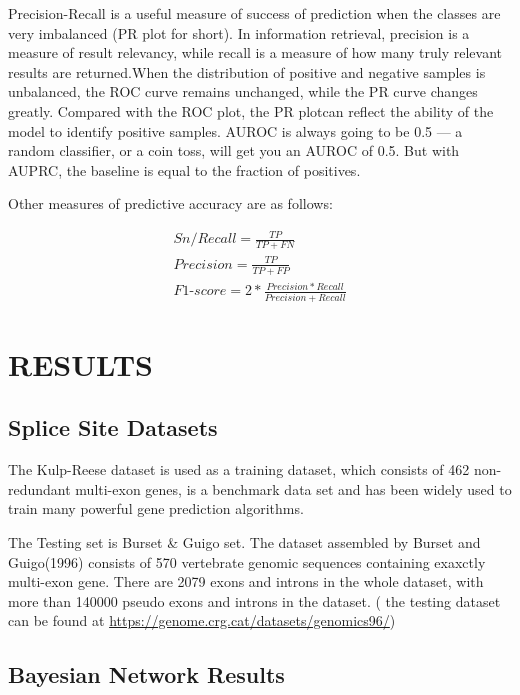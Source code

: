 \documentclass{gapd}
\begin{document}
Precision-Recall is a useful measure of success of prediction when the
classes are very imbalanced (PR plot for short). In information
retrieval, precision is a measure of result relevancy, while recall is a
measure of how many truly relevant results are returned.When the
distribution of positive and negative samples is unbalanced, the ROC
curve remains unchanged, while the PR curve changes greatly. Compared
with the ROC plot, the PR plotcan reflect the ability of the model to
identify positive samples. AUROC is always going to be 0.5 --- a random
classifier, or a coin toss, will get you an AUROC of 0.5. But with
AUPRC, the baseline is equal to the fraction of positives.

Other measures of predictive accuracy are as follows:

\begin{gather*}%
  Sn/Recall = \frac{TP}{TP+FN} \\
  Precision = \frac{TP}{TP+FP} \\
  F1\text{-}score =2* \frac{Precision*Recall}{Precision+Recall}
\end{gather*}

\section{RESULTS}\label{results}

\subsection{Splice Site Datasets}\label{splice-site-datasets}

The Kulp-Reese dataset is used as a training dataset, which consists of
462 non-redundant multi-exon genes, is a benchmark data set and has been
widely used to train many powerful gene prediction algorithms.

The Testing set is Burset \& Guigo set. The dataset assembled by Burset
and Guigo(1996) consists of 570 vertebrate genomic sequences containing
exaxctly multi-exon gene. There are 2079 exons and introns in the whole
dataset, with more than 140000 pseudo exons and introns in the dataset.
( the testing dataset can be found at
\url{https://genome.crg.cat/datasets/genomics96/})

\subsection{Bayesian Network Results}\label{bayesian-network-results}
\end{document}
